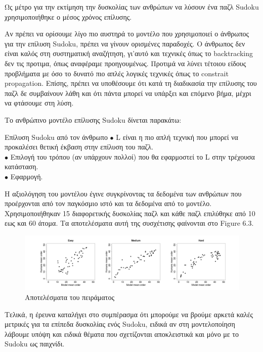 \documentclass[oneside,12pt]{book}
\theoremstyle{definition}
\begin{document}
Ως μέτρο για την εκτίμηση την δυσκολίας των ανθρώπων να λύσουν ένα παζλ Sudoku χρησιμοποιήθηκε ο μέσος χρόνος επίλυσης.

Αν πρέπει να ορίσουμε λίγο πιο αυστηρά το μοντέλο που χρησιμοποιεί ο άνθρωπος για την επίλυση Sudoku, πρέπει να γίνουν ορισμένες παραδοχές. Ο άνθρωπος δεν είναι καλός στη συστηματική αναζήτηση, γι'αυτό και τεχνικές όπως το backtracking δεν τις προτιμα, όπως αναφέραμε προηγουμένως. Προτιμά να λύνει τέτοιου είδους προβλήματα με όσο το δυνατό πιο απλές λογικές τεχνικές όπως το constrait propagation. Επίσης, πρέπει να υποθέσουμε ότι κατά τη διαδικασία την επίλυσης του παζλ δε συμβαίνουν λάθη και ότι πάντα μπορεί να υπάρξει και επόμενο βήμα, μέχρι να φτάσουμε στη λύση. \par

Το ανθρώπινο μοντέλο επίλυσης Sudoku δίνεται παρακάτω:

\begin{mytheorem}{Επίλυση Sudoku από τον άνθρωπο}{}
	\(\bullet\) L είναι η πιο απλή τεχνική που μπορεί να προκαλέσει θετική έκβαση στην επίλυση του παζλ. \\
	\(\bullet\) Επιλογή του τρόπου (αν υπάρχουν πολλοί) που θα εφαρμοστεί το L στην τρέχουσα κατάσταση. \\
	\(\bullet\) Εφαρμογή. \\
\end{mytheorem}

Η αξιολόγηση του μοντέλου έγινε συγκρίνοντας τα δεδομένα των ανθρώπων που προέρχονται από τον παγκόσμιο ιστό και τα δεδομένα από το μοντέλο. Χρησιμοποιήθηκαν 15 διαφορετικής δυσκολίας παζλ και κάθε παζλ επιλύθηκε από 10 εως και 60 άτομα. Τα αποτελέσματα αυτή της συσχέτισης φαίνονται στο Figure 6.3. \par

\begin{figure}[h]
	\centering
	\includegraphics[scale=0.4]{Figures/results.png}
	\caption{Αποτελέσματα του πειράματος \cite{5}}
\end{figure}

Τελικά, η έρευνα \cite{5} καταλήγει στο συμπέρασμα ότι μπορούμε να βρούμε αρκετά καλές μετρικές για τα επίπεδα δυσκολίας ενός Sudoku, ειδικά αν στη μοντελοποίηση λάβουμε υπόψη και ειδικά θέματα που σχετίζονται αποκλειστικά και μόνο με το Sudoku ως παιχνίδι.
\end{document}
